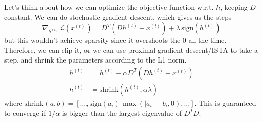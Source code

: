 \documentclass{article}
\begin{document}
  Let's think about how we can optimize the objective function w.r.t. $h$, keeping $D$ constant. We can do stochastic gradient descent, which gives us the steps
  \begin{equation}
    \nabla_{h^{(t)}} \mathcal{L}(x^{(t)}) = D^T (D h^{(t)} - x^{(t)}) + \lambda \, \mathrm{sign}(h^{(t)})
  \end{equation}
  but this wouldn't achieve sparsity since it overshoots the $0$ all the time. Therefore, we can clip it, or we can use proximal gradient descent/ISTA to take a step, and shrink the parameters according to the L1 norm. 
  \begin{align} 
    h^{(t)} & = h^{(t)} - \alpha D^T (D h^{(t)} - x^{(t)}) \\
    h^{(t)} & = \mathrm{shrink}(h^{(t)}, \alpha \lambda)
  \end{align}
  where $\mathrm{shrink}(a, b) = [\ldots, \mathrm{sign}(a_i)\, \max(|a_i| - b_i, 0), \ldots]$. This is guaranteed to converge if $1/\alpha$ is bigger than the largest eigenvalue of $D^T D$.  




\end{document}
